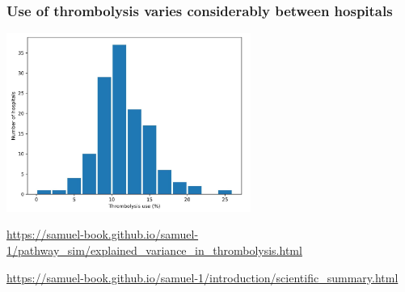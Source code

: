 \documentclass[xcolor={usenames,dvipsnames}]{beamer}
\newcommand{\smallurl}[1]{\textcolor{blue}{\fontsize{4pt}{4.8pt}\selectfont \url{#1}}}
\begin{document}
\begin{frame}
\frametitle{Use of thrombolysis varies considerably between hospitals}
\begin{center}
\includegraphics[width=0.6\textwidth]{./images/thrombolysis_use_between_hospitals}
\end{center}


% 
\smallurl{https://samuel-book.github.io/samuel-1/pathway_sim/explained_variance_in_thrombolysis.html}

\smallurl{https://samuel-book.github.io/samuel-1/introduction/scientific_summary.html}


\end{frame}











\end{document}

